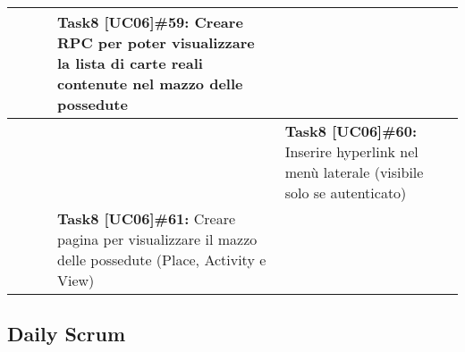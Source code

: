 \documentclass{article}
\begin{document}
\begin{itemize}
\begin{tabular}{ | p{3.3cm} | p{1.3cm} | p{1.1cm} | p{4.4cm} | p{4.4cm} | }
            \hline
            & & & \textbf{Task8 [UC06]\#59:} Creare RPC per poter visualizzare la lista di carte reali contenute nel mazzo delle possedute & \\
            \hline
            & &  & & \textbf{Task8 [UC06]\#60:} Inserire hyperlink nel menù laterale (visibile solo se autenticato) \\
            \hline
            & & & \textbf{Task8 [UC06]\#61:} Creare pagina per visualizzare il mazzo delle possedute (Place, Activity e View) & \\
            \hline
        \end{tabular}
    \end{itemize}




    \subsection{Daily Scrum}
\end{document}

